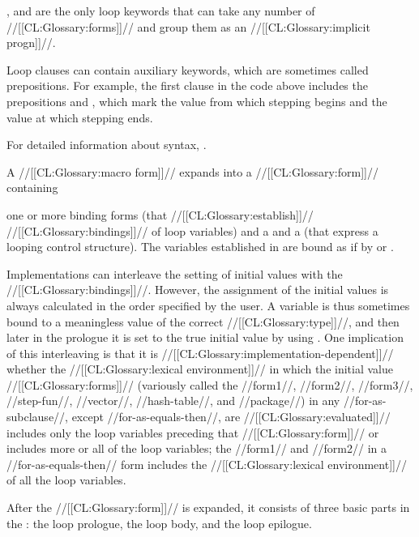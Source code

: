 , and  
are the only loop keywords that can take any number of //[[CL:Glossary:forms]]// and 
group them as an //[[CL:Glossary:implicit progn]]//.


Loop clauses can contain auxiliary keywords, which are sometimes
called prepositions.  For example, the first clause in the code
above includes the prepositions  and , 
which mark the value from which stepping begins and the value at which stepping
ends.

For detailed information about  syntax,
.

\endsubsubsection%
 





A  //[[CL:Glossary:macro form]]// expands into a //[[CL:Glossary:form]]// containing

one or more binding forms (that //[[CL:Glossary:establish]]// //[[CL:Glossary:bindings]]// of loop variables)
and a  and a  (that express a looping control 
structure). The variables established in  are bound as
if by  or .  

Implementations can interleave the setting of initial values with the //[[CL:Glossary:bindings]]//.  
However, the assignment of the initial values is always calculated in the order
specified by the user.  A variable is thus sometimes bound to a meaningless value 
of the correct //[[CL:Glossary:type]]//, and then later in the prologue it is set to the true
initial value by using .
One implication of this interleaving is that it is //[[CL:Glossary:implementation-dependent]]//
whether the //[[CL:Glossary:lexical environment]]// in which the initial value //[[CL:Glossary:forms]]//
(variously called the //form1//, //form2//, //form3//, //step-fun//,
 //vector//, //hash-table//, and //package//) in any //for-as-subclause//,
except //for-as-equals-then//,
are //[[CL:Glossary:evaluated]]// includes only the loop variables preceding that //[[CL:Glossary:form]]//
or includes more or all of the loop variables;
the //form1// and //form2// in a //for-as-equals-then// form
includes the //[[CL:Glossary:lexical environment]]// of all the loop variables.

 

After the //[[CL:Glossary:form]]// is expanded, it consists of three basic parts in the 
: 
      the loop prologue,
      the loop body,
  and the loop epilogue.

